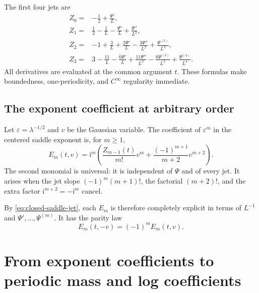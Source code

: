\documentclass[11pt,oneside]{article}
\theoremstyle{definition}
\theoremstyle{remark}
\newcommand{\ii}{\mathrm i}
\begin{document}
The first four jets are
\begin{align}
 Z_0={}&-\frac12+\frac{\Psi'}L,                              \label{eq:Z0-explicit}\\
 Z_1={}&\frac12-\frac1L-\frac{\Psi'}L+\frac{\Psi''}{L^2},  \label{eq:Z1-explicit}\\
 Z_2={}&-1+\frac3L+\frac{2\Psi'}L-\frac{3\Psi''}{L^2}
             +\frac{\Psi^{(3)}}{L^3},                       \label{eq:Z2-explicit}\\
 Z_3={}&3-\frac{11}{L}-\frac{6\Psi'}L+\frac{11\Psi''}{L^2}
             -\frac{6\Psi^{(3)}}{L^3}+\frac{\Psi^{(4)}}{L^4}.
                                                                    \label{eq:Z3-explicit}
\end{align}
All derivatives are evaluated at the common argument $t$.  These formulas make boundedness,
one-periodicity, and $C^\infty$ regularity immediate.

\subsection{The exponent coefficient at arbitrary order}

Let $\varepsilon=\lambda^{-1/2}$ and $v$ be the Gaussian variable.  The coefficient of
$\varepsilon^m$ in the centered saddle exponent is, for $m\ge1$,
\begin{equation}
 E_m(t,v)=\ii^m\left(
 \frac{Z_{m-1}(t)}{m!}v^m
 +\frac{(-1)^{m+1}}{m+2}v^{m+2}
\right).
 \label{eq:closed-exponent-coefficient}
\end{equation}
The second monomial is universal: it is independent of $\Psi$ and of every jet.  It arises
when the jet slope $(-1)^{m}(m+1)!$, the factorial $(m+2)!$, and the extra factor
$\ii^{m+2}=-\ii^m$ cancel.

By \eqref{eq:closed-saddle-jet}, each $E_m$ is therefore completely explicit in terms of
$L^{-1}$ and $\Psi',\ldots,\Psi^{(m)}$.  It has the parity law
\begin{equation}
 E_m(t,-v)=(-1)^mE_m(t,v).
 \label{eq:exponent-coefficient-parity}
\end{equation}

\section{From exponent coefficients to periodic mass and log coefficients}
\label{sec:saddle-coeff-engine}
\end{document}
